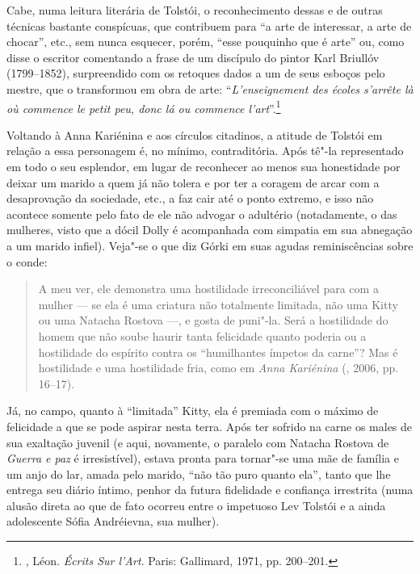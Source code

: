 Cabe, numa leitura literária de Tolstói, o reconhecimento dessas e de
outras técnicas bastante conspícuas, que contribuem para
``a arte de interessar, a arte de chocar'', etc., sem nunca esquecer,
porém, ``esse pouquinho que é arte'' ou, como disse o escritor
comentando a frase de um discípulo do pintor Karl
Briullóv (1799--1852), surpreendido com os retoques dados
a um de seus esboços pelo mestre, que o transformou em obra de arte:
``\emph{L'enseignement des écoles s'arrête là où commence le petit
peu, donc lá ou commence l'art}''.\footnote{, Léon. \emph{Écrits Sur l'Art}. Paris: Gallimard, 1971, pp. 200--201.}

Voltando à Anna Kariénina e aos círculos citadinos, a atitude de
Tolstói em relação a essa personagem é, no mínimo, contraditória. Após
tê"-la representado em todo o seu esplendor, em lugar de reconhecer ao
menos sua honestidade por deixar um marido a quem já não tolera e
por ter a coragem de arcar com a desaprovação da sociedade, etc., a faz
cair até o ponto extremo, e isso não acontece somente pelo fato de ele
não advogar o adultério (notadamente, o das mulheres, visto que a dócil
Dolly é acompanhada com simpatia em sua abnegação a um marido infiel).
Veja"-se o que diz Górki em suas agudas reminiscências sobre o conde:

\begin{quotation}
A meu ver, ele demonstra uma hostilidade irreconciliável para com a
mulher --- se ela é uma criatura não totalmente limitada, não uma Kitty
ou uma Natacha Rostova ---, e gosta de puni"-la. Será a hostilidade do
homem que não soube haurir tanta felicidade quanto poderia ou a
hostilidade do espírito contra os ``humilhantes ímpetos da carne''? Mas é
hostilidade e uma hostilidade fria, como em \emph{Anna Kariénina} (, 2006, pp. 16--17).
\end{quotation}

Já, no campo, quanto à ``limitada'' Kitty, ela é premiada com o
máximo de felicidade a que se pode aspirar nesta terra.
Após ter sofrido na carne os males de sua exaltação juvenil (e aqui,
novamente, o paralelo com Natacha Rostova de \emph{Guerra e paz} é
irresistível), estava pronta para tornar"-se uma mãe de família e um anjo do lar,
amada pelo marido, ``não tão puro quanto ela'', tanto que lhe entrega seu diário
íntimo, penhor da futura fidelidade e confiança irrestrita (numa alusão
direta ao que de fato ocorreu entre o impetuoso Lev Tolstói e a ainda
adolescente Sófia Andréievna, sua mulher).

